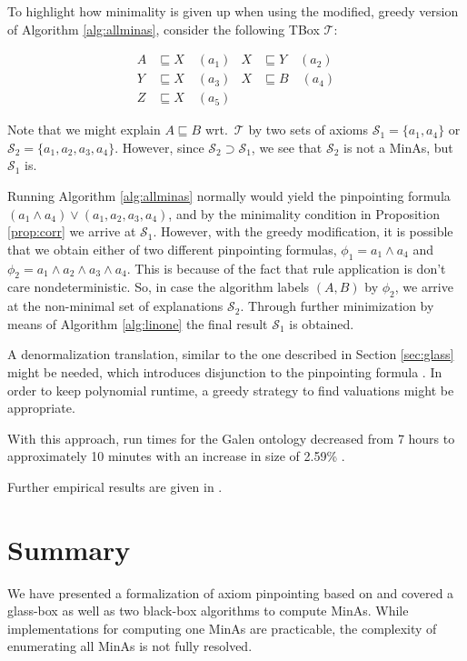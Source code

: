 \documentclass{llncs}
\newcommand{\tb}{\ensuremath{\mathcal{T}}\xspace} %
\newcommand{\subsume}{\sqsubseteq}
\begin{document}
\begin{example}
To highlight how minimality is given up when using the modified, greedy version of Algorithm \ref{alg:allminas}, consider the following TBox $\tb$:

\begin{align*}
A &\subsume X \quad (a_1) &
X &\subsume Y \quad (a_2) \\
Y &\subsume X \quad (a_3) &
X &\subsume B \quad (a_4) \\
Z &\subsume X \quad (a_5) &
\end{align*}

Note that we might explain $A \subsume B$ wrt.~$\tb$ by two sets of axioms $\mathcal{S}_1 = \{ a_1, a_4 \}$ or $\mathcal{S}_2 = \{ a_1, a_2, a_3, a_4 \}$. However, since $\mathcal{S}_2 \supset \mathcal{S}_1$, we see that $\mathcal{S}_2$ is not a MinAs, but $\mathcal{S}_1$ is.

Running Algorithm \ref{alg:allminas} normally would yield the pinpointing formula $(a_1 \wedge a_4) \vee (a_1, a_2, a_3, a_4)$, and by the minimality condition in Proposition \ref{prop:corr} we arrive at $\mathcal{S}_1$. However, with the greedy modification, it is possible that we obtain either of two different pinpointing formulas, $\phi_1 = a_1 \wedge a_4$ and $\phi_2 = a_1 \wedge a_2 \wedge a_3 \wedge a_4$. This is because of the fact that rule application is don't care nondeterministic. So, in case the algorithm labels $(A, B)$ by $\phi_2$, we arrive at the non-minimal set of explanations $\mathcal{S}_2$. Through further minimization by means of Algorithm \ref{alg:linone} the final result $\mathcal{S}_1$ is obtained.
\end{example}

A denormalization translation, similar to the one described in Section \ref{sec:glass} might be needed, which introduces disjunction to the pinpointing formula \cite[Sec.~5]{orig1,orig2}. In order to keep polynomial runtime, a greedy strategy to find valuations might be appropriate.

With this approach, run times for the Galen \cite{galen} ontology decreased from 7 hours to approximately 10 minutes with an increase in size of 2.59\% \cite[Sec.~5]{orig1,orig2}.

Further empirical results are given in \cite[Sec.~6.2.5, p.~127]{meng-phd}.

\section{Summary}
\label{sec:summary}

We have presented a formalization of axiom pinpointing based on \cite{orig1,orig2} and covered a glass-box as well as two black-box algorithms to compute MinAs. While implementations for computing one MinAs are practicable, the complexity of enumerating all MinAs is not fully resolved.


\end{document}
